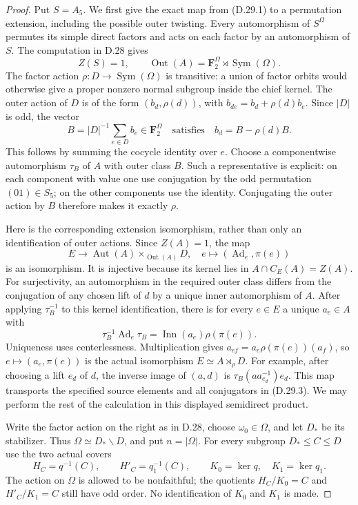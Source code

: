 \begin{proof}
Put $S=A_5$.  We first give the exact map from
\textup{(D.29.1)} to a permutation extension, including
the possible outer twisting.  Every automorphism of
$S^{\Omega}$ permutes its simple direct factors and
acts on each factor by an automorphism of $S$.
The computation in D.28 gives
\[
 Z(S)=1,\qquad
 \operatorname{Out}(A)=\mathbf F_2^{\Omega}
                         \rtimes\operatorname{Sym}(\Omega).
 \tag{D.29.4}
\]
The factor action $\rho:D\to\operatorname{Sym}(\Omega)$
is transitive: a union of factor orbits would otherwise
give a proper nonzero normal subgroup inside the chief
kernel.  The outer action of $D$ is of the form
$(b_d,\rho(d))$, with
$b_{de}=b_d+\rho(d)b_e$.
Since $|D|$ is odd, the vector
\[
 B=|D|^{-1}\sum_{e\in D}b_e\in\mathbf F_2^{\Omega}
 \quad\text{satisfies}\quad b_d=B-\rho(d)B.
 \tag{D.29.5}
\]
This follows by summing the cocycle identity over $e$.
Choose a componentwise automorphism $\tau_B$ of $A$
with outer class $B$.  Such a representative is explicit:
on each component with value one use conjugation by the
odd permutation $(01)\in S_5$; on the other components
use the identity.  Conjugating the outer action by $B$
therefore makes it exactly $\rho$.

Here is the corresponding extension isomorphism, rather
than only an identification of outer actions.  Since
$Z(A)=1$, the map
\[
 E\longrightarrow\operatorname{Aut}(A)
                       \times_{\operatorname{Out}(A)}D,
       \quad e\longmapsto(\operatorname{Ad}_e,\pi(e))
 \tag{D.29.6}
\]
is an isomorphism.  It is injective because its kernel
lies in $A\cap C_E(A)=Z(A)$.  For surjectivity, an
automorphism in the required outer class differs from
the conjugation of any chosen lift of $d$ by a unique
inner automorphism of $A$.
After applying $\tau_B^{-1}$ to this kernel identification,
there is for every $e\in E$ a unique $a_e\in A$ with
\[
 \tau_B^{-1}\operatorname{Ad}_e\tau_B
              =\operatorname{Inn}(a_e)\rho(\pi(e)).
 \tag{D.29.7}
\]
Uniqueness uses centerlessness.  Multiplication gives
$a_{ef}=a_e\rho(\pi(e))(a_f)$, so
$e\mapsto(a_e,\pi(e))$ is the actual isomorphism
$E\simeq A\rtimes_\rho D$.  For example, after choosing
a lift $e_d$ of $d$, the inverse image of $(a,d)$ is
$\tau_B(a a_{e_d}^{-1})e_d$.
This map transports the specified source elements and
all conjugators in \textup{(D.29.3)}.  We may perform
the rest of the calculation in this displayed
semidirect product.

Write the factor action on the right as in D.28,
choose $\omega_0\in\Omega$, and let $D_*$ be its
stabilizer.  Thus $\Omega\simeq D_*\backslash D$,
and put $n=|\Omega|$.  For every subgroup
$D_*\leq C\leq D$ use the two actual covers
\[
 H_C=q^{-1}(C),\qquad
 H'_C=q_1^{-1}(C),\qquad
 K_0=\ker q,\quad K_1=\ker q_1.
 \tag{D.29.8}
\]
The action on $\Omega$ is allowed to be nonfaithful;
the quotients $H_C/K_0=C$ and $H'_C/K_1=C$ still
have odd order.  No identification of $K_0$ and
$K_1$ is made.


\end{proof}
